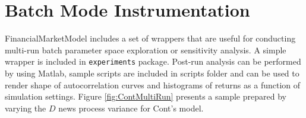 \documentclass[runningheads]{llncs}
\begin{document}
\section{Batch Mode Instrumentation}

FinancialMarketModel includes a set of wrappers that are useful for conducting multi-run batch parameter space exploration or sensitivity analysis. A simple wrapper is included in \texttt{experiments} package. Post-run analysis can be performed by using Matlab, sample scripts are included in scripts folder and can be used to render shape of autocorrelation curves and histograms of returns as a function of simulation settings. Figure \ref{fig:ContMultiRun} presents a sample prepared by varying the $D$ news process variance for Cont's model.    


\begin{figure}[htbp]
  \begin{center}
   \mbox{
       \quad
}
\end{center}
\end{figure}
\end{document}
